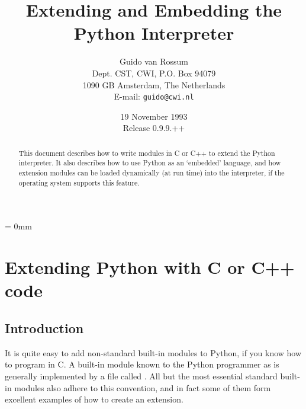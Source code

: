 
\title{\bf Extending and Embedding the Python Interpreter}

\author{
	Guido van Rossum \\
	Dept. CST, CWI, P.O. Box 94079 \\
	1090 GB Amsterdam, The Netherlands \\
	E-mail: {\tt guido@cwi.nl}
}

\date{19 November 1993 \\ Release 0.9.9.++} %

\makeindex




\maketitle

\begin{abstract}

\noindent
This document describes how to write modules in C or C++ to extend the
Python interpreter.  It also describes how to use Python as an
`embedded' language, and how extension modules can be loaded
dynamically (at run time) into the interpreter, if the operating
system supports this feature.

\end{abstract}

\pagebreak

{
\parskip = 0mm
\tableofcontents
}

\pagebreak



\chapter{Extending Python with C or C++ code}


\section{Introduction}

It is quite easy to add non-standard built-in modules to Python, if
you know how to program in C.  A built-in module known to the Python
programmer as  is generally implemented by a file called
.  All but the most essential standard built-in
modules also adhere to this convention, and in fact some of them form
excellent examples of how to create an extension.

